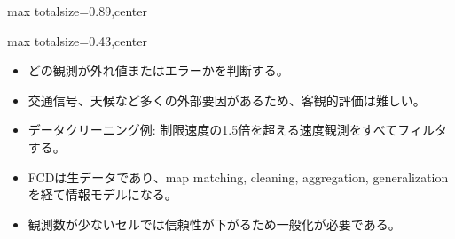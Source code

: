 \begin{minipage}[t]{0.58\textwidth}
\begin{adjustbox}{max totalsize={\textwidth}{0.89\textheight},center}
\begin{minipage}{\textwidth}
\end{minipage}
\end{adjustbox}
\end{minipage}


\clearpage
{}
\begin{minipage}[t]{0.405\textwidth}
\begin{adjustbox}{max totalsize={\textwidth}{0.43\textheight},center}
\begin{minipage}{\textwidth}\scriptsize
{}\begin{itemize}
\item どの観測が外れ値またはエラーかを判断する。
\item 交通信号、天候など多くの外部要因があるため、客観的評価は難しい。
\item データクリーニング例: 制限速度の1.5倍を超える速度観測をすべてフィルタする。
\end{itemize}\begin{itemize}
\item FCDは生データであり、map matching, cleaning, aggregation, generalization を経て情報モデルになる。
\item 観測数が少ないセルでは信頼性が下がるため一般化が必要である。
\end{itemize}
\end{minipage}
\end{adjustbox}
\end{minipage}\hfill
